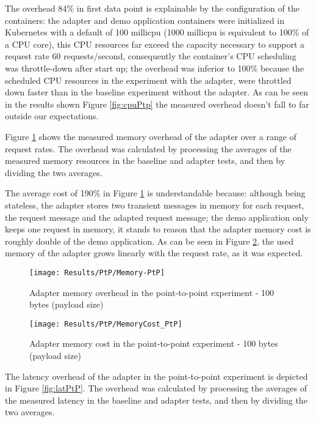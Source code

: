 The overhead 84\% in first data point is explainable by the configuration of the containers:
the adapter and demo application containers were initialized in Kubernetes with a default of 100 millicpu (1000 millicpu is equivalent to 100\% of a CPU core),
this CPU resources far exceed the capacity necessary to support a request rate 60 requests/second,
consequently the container's CPU scheduling was throttle-down after start up;
the overhead was inferior to 100\% because the scheduled CPU resources in the experiment with the adapter, were throttled down faster than in the baseline experiment without the adapter.
As can be seen in the results shown Figure \ref{fig:cpuPtp} the measured overhead doesn't fall to far outside our expectations.

Figure \ref{fig:memPtp} shows the measured memory overhead of the adapter over a
range of request rates.
The overhead was calculated by processing the averages of the measured memory resources in the baseline and adapter tests, and then by dividing the two averages.

The average cost of 190\% in Figure \ref{fig:memPtp} is understandable because: although being stateless, the adapter stores two transient messages in memory for each request, the request message and the adapted request message;
the demo application only keeps one request in memory, it stands to reason that the adapter memory cost is roughly double of the demo application.
As can be seen in Figure \ref{fig:memCostPtp}, the used memory of the adapter grows linearly with the request rate, as it was expected.

\begin{figure}[htbp]
    \centering
    \centerline{\texttt{[image: Results/PtP/Memory-PtP]}}
    \caption{Adapter memory overhead in the point-to-point experiment - 100 bytes (payload size)}
    \label{fig:memPtp}
\end{figure}

\begin{figure}[htbp]
    \centering
    \centerline{\texttt{[image: Results/PtP/MemoryCost\_PtP]}}
    \caption{Adapter memory cost in the point-to-point experiment - 100 bytes (payload size)}
    \label{fig:memCostPtp}
\end{figure}

\newpage

The latency overhead of the adapter in the point-to-point experiment is depicted in Figure \ref{fig:latPtP}.
The overhead was calculated by processing the averages of the measured latency in the baseline and adapter tests, and then by dividing the two averages.

